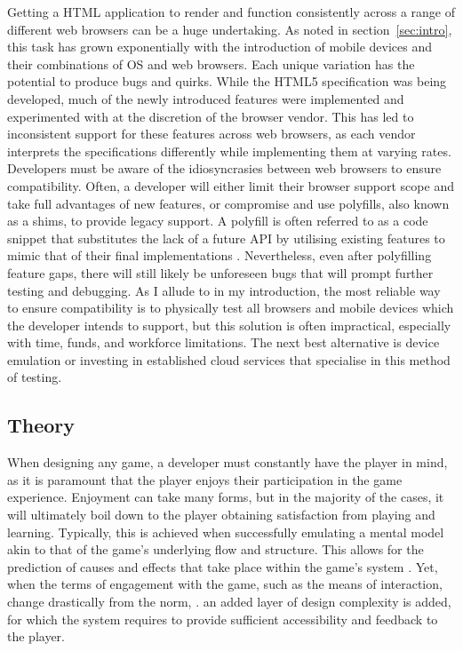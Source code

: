 \documentclass[final]{cmpreport}
\begin{document}
Getting a HTML application to render and function consistently across a range of different web browsers can be a huge undertaking. As noted in section~\ref{sec:intro}, this task has grown exponentially with the introduction of mobile devices and their combinations of OS and web browsers. Each unique variation has the potential to produce bugs and quirks. While the HTML5 specification was being developed, much of the newly introduced features were implemented and experimented with at the discretion of the browser vendor. This has led to inconsistent support for these features across web browsers, as each vendor interprets the specifications differently while implementing them at varying rates. Developers must be aware of the idiosyncrasies between web browsers to ensure compatibility. Often, a developer will either limit their browser support scope and take full advantages of new features, or compromise and use polyfills, also known as a shims, to provide legacy support. A polyfill is often referred to as a code snippet that substitutes the lack of a future API by utilising existing features to mimic that of their final implementations \cite{Lawson}. Nevertheless, even after polyfilling feature gaps, there will still likely be unforeseen bugs that will prompt further testing and debugging. As I allude to in my introduction, the most reliable way to ensure compatibility is to physically test all browsers and mobile devices which the developer intends to support, but this solution is often impractical, especially with time, funds, and workforce limitations. The next best alternative is device emulation or investing in established cloud services that specialise in this method of testing.

\subsection{Theory}
When designing any game, a developer must constantly have the player in mind, as it is paramount that the player enjoys their participation in the game experience. Enjoyment can take many forms, but in the majority of the cases, it will ultimately boil down to the player obtaining satisfaction from playing and learning. Typically, this is achieved when successfully emulating a mental model akin to that of the game's underlying flow and structure. This allows for the prediction of causes and effects that take place within the game's system \cite{Cook}. Yet, when the terms of engagement  with the game, such as the means of interaction, change drastically from the norm, . an added layer of design complexity is added, for which the system requires to provide sufficient accessibility and feedback to the player.
\end{document}
